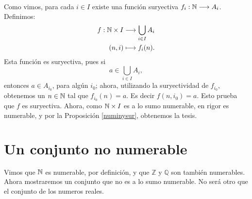 \begin{demo} Como vimos, para cada $i\in I$ existe una función
suryectiva $f_i:\mathbb{N}\longrightarrow A_i$. Definimos:
\[\begin{split}
      f:\mathbb{N}\times I &\longrightarrow \bigcup_{i\in I}A_i\\
         (n,i)&\longmapsto f_i(n).\\
 \end{split}
\]
Esta función es suryectiva, pues si
\[a\in\bigcup_{i\in I}A_i,\]
entonces $a\in A_{i_0}$, para algún $i_0$; ahora, utilizando la
suryectividad de $f_{i_0}$, obtenemos un $n\in\mathbb{N}$ tal que
$f_{i_0}(n)=a$. Es decir $f(n,i_0)=a$. Esto prueba que $f$  es
suryectiva. Ahora, como $\mathbb{N}\times I$ es a lo sumo numerable, en
rigor es numerable, y por la Proposición \vref{numinysur},
obtenemos la tesis.
\end{demo}


\section{Un conjunto no numerable} 
Vimos que $\mathbb{N}$ es numerable, por definición, y que $\mathbb{Z}$
y $\mathbb{Q}$ son también numerables. Ahora mostraremos un
conjunto que no es a lo sumo numerable. No será otro que el
conjunto de los numeros reales.


